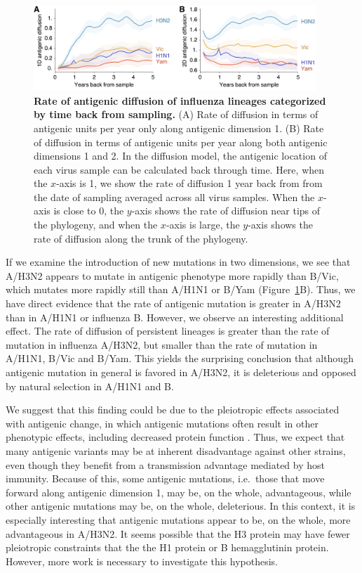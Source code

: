 \documentclass[11pt,oneside,letterpaper]{article}
\begin{document}
\begin{figure}[tb]
	\centering		
	\includegraphics[width=0.95\textwidth]{figures/accumulation}
	\caption{\textbf{Rate of antigenic diffusion of influenza lineages categorized by time back from sampling.}
	(A) Rate of diffusion in terms of antigenic units per year only along antigenic dimension 1.
	(B) Rate of diffusion in terms of antigenic units per year along both antigenic dimensions 1 and 2.
	In the diffusion model, the antigenic location of each virus sample can be calculated back through time.
	Here, when the $x$-axis is 1, we show the rate of diffusion 1 year back from from the date of sampling averaged across all virus samples.
	When the $x$-axis is close to 0, the $y$-axis shows the rate of diffusion near tips of the phylogeny, and when the $x$-axis is large, the $y$-axis shows the rate of diffusion along the trunk of the phylogeny.
	} 
	\label{accumulation} 
\end{figure}

If we examine the introduction of new mutations in two dimensions, we see that A/H3N2 appears to mutate in antigenic phenotype more rapidly than B/Vic, which mutates more rapidly still than A/H1N1 or B/Yam (Figure~\ref{accumulation}B).
Thus, we have direct evidence that the rate of antigenic mutation is greater in A/H3N2 than in A/H1N1 or influenza B.
However, we observe an interesting additional effect.
The rate of diffusion of persistent lineages is greater than the rate of mutation in influenza A/H3N2, but smaller than the rate of mutation in A/H1N1, B/Vic and B/Yam.
This yields the surprising conclusion that although antigenic mutation in general is favored in A/H3N2, it is deleterious and opposed by natural selection in A/H1N1 and B.

We suggest that this finding could be due to the pleiotropic effects associated with antigenic change, in which antigenic mutations often result in other phenotypic effects, including decreased protein function \cite{Kaverin04,Rudneva12}.
Thus, we expect that many antigenic variants may be at inherent disadvantage against other strains, even though they benefit from a transmission advantage mediated by host immunity.
Because of this, some antigenic mutations, i.e.\ those that move forward along antigenic dimension 1, may be, on the whole, advantageous, while other antigenic mutations may be, on the whole, deleterious.
In this context, it is especially interesting that antigenic mutations appear to be, on the whole, more advantageous in A/H3N2.
It seems possible that the H3 protein may have fewer pleiotropic constraints that the the H1 protein or B hemagglutinin protein.
However, more work is necessary to investigate this hypothesis.
\end{document}
